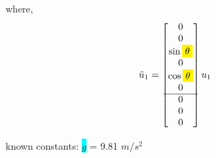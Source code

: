 \documentclass[12pt]{article}
\begin{document}
where, 
\begin{align*}
    \tilde{u}_1 &= \begin{bmatrix}
        0 \\
        0 \\
        \sin{\colorbox{yellow}{$\theta$}} \\
        0 \\
        \cos{\colorbox{yellow}{$\theta$}} \\
        0 \\
        \hline
        0 \\
        0 \\
        0 \\
    \end{bmatrix} u_1
\end{align*}

known constants: \colorbox{cyan}{$g$} = 9.81 $m/s^2$ \\
\end{document}
